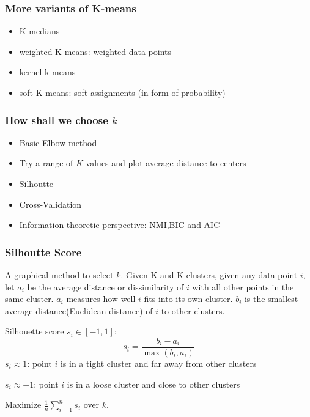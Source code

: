 \subsubsection{More variants of K-means}
\begin{itemize}
    \item K-medians
    \item weighted K-means: weighted data points
    \item kernel-k-means
    \item soft K-means: soft assignments (in form of probability)
\end{itemize}

\subsubsection{How shall we choose \(k\)}
\begin{itemize}
    \item Basic Elbow method
    \item Try a range of \(K\) values and plot average distance to centers
    \item Silhoutte
    \item Cross-Validation
    \item Information theoretic perspective: NMI,BIC and AIC
\end{itemize}

\subsubsection*{Silhoutte Score}
A graphical method to select \(k\).
Given K and K clusters, given any data point \(i\), let \(a_i\) be the average distance or dissimilarity of \(i\) with all other points in the same cluster.
\(a_i\) measures how well \(i\) fits into its own cluster.
\(b_i\) is the smallest average distance(Euclidean distance) of \(i\) to other clusters.

Silhouette score \(s_i \in \left[-1,1\right]\):
\[
s_i = \frac{b_i - a_i}{\max(b_i,a_i)}
\]
\(s_i\approx 1\): point \(i\) is in a tight cluster and far away from other clusters

\(s_i\approx -1\): point \(i\) is in a loose cluster and close to other clusters

Maximize \(\frac{1}{n}\sum_{i = 1}^n s_i\) over \(k\).


